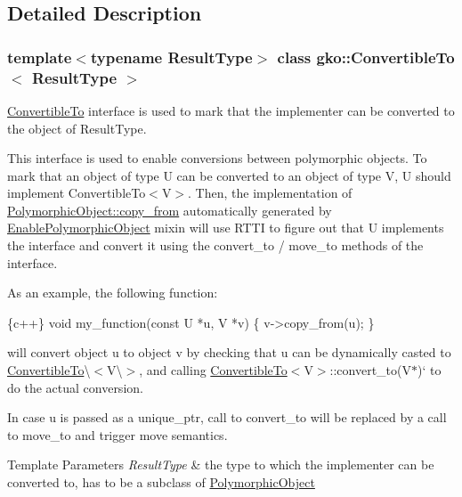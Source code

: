 \subsection{Detailed Description}
\subsubsection*{template$<$typename Result\+Type$>$\newline
class gko\+::\+Convertible\+To$<$ Result\+Type $>$}

\hyperlink{classgko_1_1ConvertibleTo}{Convertible\+To} interface is used to mark that the implementer can be converted to the object of Result\+Type. 

This interface is used to enable conversions between polymorphic objects. To mark that an object of type {\ttfamily U} can be converted to an object of type {\ttfamily V}, {\ttfamily U} should implement Convertible\+To$<$\+V$>$. Then, the implementation of {\ttfamily \hyperlink{classgko_1_1PolymorphicObject_a5e6f713938293cfbe788d00480eb4d81}{Polymorphic\+Object\+::copy\+\_\+from}} automatically generated by {\ttfamily \hyperlink{classgko_1_1EnablePolymorphicObject}{Enable\+Polymorphic\+Object}} mixin will use R\+T\+TI to figure out that {\ttfamily U} implements the interface and convert it using the convert\+\_\+to / move\+\_\+to methods of the interface.

As an example, the following function\+:


\begin{DoxyCode}
\{c++\}
\textcolor{keywordtype}{void} my\_function(\textcolor{keyword}{const} U *u, V *v) \{
    v->copy\_from(u);
\}
\end{DoxyCode}


will convert object {\ttfamily u} to object {\ttfamily v} by checking that {\ttfamily u} can be dynamically casted to {\ttfamily \hyperlink{classgko_1_1ConvertibleTo}{Convertible\+To}\textbackslash{}$<$V\textbackslash{}$>$}, and calling \hyperlink{classgko_1_1ConvertibleTo}{Convertible\+To}$<$V$>$\+::convert\+\_\+to(\+V$\ast$)` to do the actual conversion.

In case {\ttfamily u} is passed as a unique\+\_\+ptr, call to {\ttfamily convert\+\_\+to} will be replaced by a call to {\ttfamily move\+\_\+to} and trigger move semantics.


\begin{DoxyTemplParams}{Template Parameters}
{\em Result\+Type} & the type to which the implementer can be converted to, has to be a subclass of \hyperlink{classgko_1_1PolymorphicObject}{Polymorphic\+Object} \\
\hline
\end{DoxyTemplParams}


